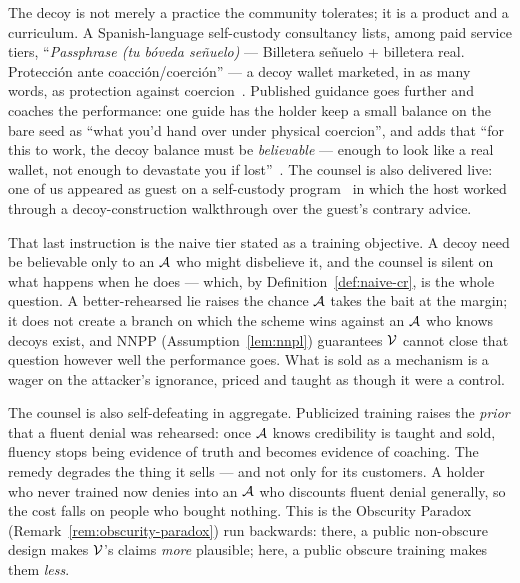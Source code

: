 \begin{remark}\label{rem:decoy-market}
The decoy is not merely a practice the community tolerates; it is a product and a
curriculum. A Spanish-language self-custody consultancy lists, among paid service
tiers, ``\emph{Passphrase (tu b\'oveda se\~nuelo)} --- Billetera se\~nuelo +
billetera real. Protecci\'on ante coacci\'on/coerci\'on'' --- a decoy wallet
marketed, in as many words, as protection against coercion~\cite{tlt-servicios}.
Published guidance goes further and coaches the performance: one guide has the
holder keep a small balance on the bare seed as ``what you'd hand over under
physical coercion'', and adds that ``for this to work, the decoy balance must be
\emph{believable} --- enough to look like a real wallet, not enough to devastate
you if lost''~\cite{bsg-passphrase}. The counsel is also delivered live: one of us
appeared as guest on a self-custody program~\cite{ong-autocustodia} in which the
host worked through a decoy-construction walkthrough over the guest's contrary
advice.

That last instruction is the naive tier stated as a training objective. A decoy
need be believable only to an $\mathcal{A}$ who might disbelieve it, and the
counsel is silent on what happens when he does --- which, by
Definition~\ref{def:naive-cr}, is the whole question. A better-rehearsed lie
raises the chance $\mathcal{A}$ takes the bait at the margin; it does not create a
branch on which the scheme wins against an $\mathcal{A}$ who knows decoys exist,
and NNPP (Assumption~\ref{lem:nnpl}) guarantees $\mathcal{V}$ cannot close that
question however well the performance goes. What is sold as a mechanism is a
wager on the attacker's ignorance, priced and taught as though it were a control.

The counsel is also self-defeating in aggregate. Publicized training raises the
\emph{prior} that a fluent denial was rehearsed: once $\mathcal{A}$ knows credibility
is taught and sold, fluency stops being evidence of truth and becomes evidence of
coaching. The remedy degrades the thing it sells --- and not only for its
customers. A holder who never trained now denies into an $\mathcal{A}$ who discounts
fluent denial generally, so the cost falls on people who bought nothing. This is
the Obscurity Paradox (Remark~\ref{rem:obscurity-paradox}) run backwards: there, a
public non-obscure design makes $\mathcal{V}$'s claims \emph{more} plausible; here, a
public obscure training makes them \emph{less}.
\end{remark}

